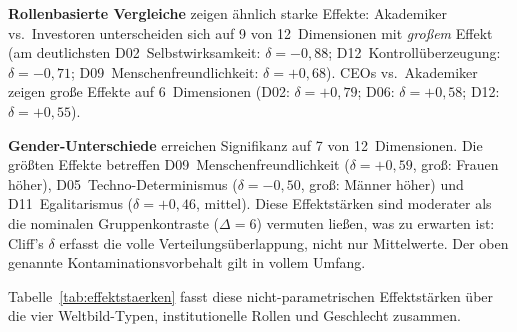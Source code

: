 \documentclass[12pt,a4paper]{article}
\begin{document}
\textbf{Rollenbasierte Vergleiche} zeigen ähnlich starke Effekte: Akademiker vs.\ Investoren unterscheiden sich auf 9 von 12~Dimensionen mit \emph{großem} Effekt (am deutlichsten D02~Selbstwirksamkeit: $\delta = -0{,}88$; D12~Kontrollüberzeugung: $\delta = -0{,}71$; D09~Menschenfreundlichkeit: $\delta = +0{,}68$). CEOs vs.\ Akademiker zeigen große Effekte auf 6~Dimensionen (D02: $\delta = +0{,}79$; D06: $\delta = +0{,}58$; D12: $\delta = +0{,}55$).

\textbf{Gender-Unterschiede} erreichen Signifikanz auf 7 von 12~Dimensionen. Die größten Effekte betreffen D09~Menschenfreundlichkeit ($\delta = +0{,}59$, groß: Frauen höher), D05~Techno-Determinismus ($\delta = -0{,}50$, groß: Männer höher) und D11~Egalitarismus ($\delta = +0{,}46$, mittel). Diese Effektstärken sind moderater als die nominalen Gruppenkontraste ($\Delta = 6$) vermuten ließen, was zu erwarten ist: Cliff's $\delta$ erfasst die volle Verteilungsüberlappung, nicht nur Mittelwerte. Der oben genannte Kontaminationsvorbehalt gilt in vollem Umfang.

Tabelle~\ref{tab:effektstaerken} fasst diese nicht-parametrischen Effektstärken über die vier Weltbild-Typen, institutionelle Rollen und Geschlecht zusammen.
\end{document}
